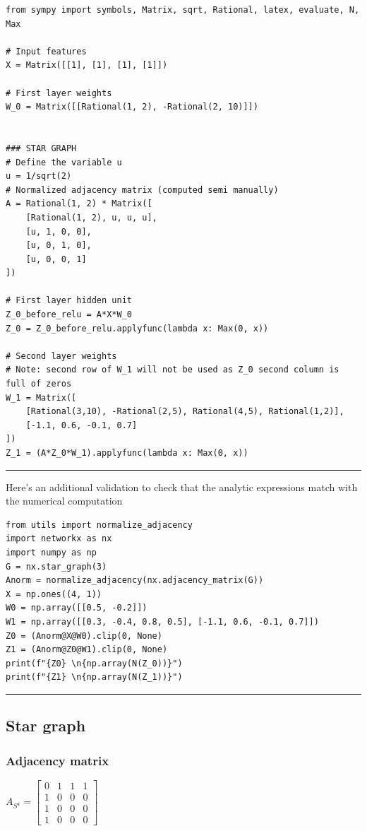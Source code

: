 \documentclass[a4paper]{article}
\begin{document}
\begin{verbatim}
from sympy import symbols, Matrix, sqrt, Rational, latex, evaluate, N, Max

# Input features
X = Matrix([[1], [1], [1], [1]])

# First layer weights
W_0 = Matrix([[Rational(1, 2), -Rational(2, 10)]])


### STAR GRAPH
# Define the variable u
u = 1/sqrt(2)
# Normalized adjacency matrix (computed semi manually)
A = Rational(1, 2) * Matrix([
    [Rational(1, 2), u, u, u],
    [u, 1, 0, 0],
    [u, 0, 1, 0],
    [u, 0, 0, 1]
])

# First layer hidden unit
Z_0_before_relu = A*X*W_0
Z_0 = Z_0_before_relu.applyfunc(lambda x: Max(0, x))

# Second layer weights 
# Note: second row of W_1 will not be used as Z_0 second column is full of zeros
W_1 = Matrix([
    [Rational(3,10), -Rational(2,5), Rational(4,5), Rational(1,2)],
    [-1.1, 0.6, -0.1, 0.7]
])
Z_1 = (A*Z_0*W_1).applyfunc(lambda x: Max(0, x))
\end{verbatim}


\hrule
Here's an additional validation to check that the analytic expressions match with the numerical computation
\begin{verbatim}
from utils import normalize_adjacency
import networkx as nx
import numpy as np
G = nx.star_graph(3)
Anorm = normalize_adjacency(nx.adjacency_matrix(G))
X = np.ones((4, 1))
W0 = np.array([[0.5, -0.2]])
W1 = np.array([[0.3, -0.4, 0.8, 0.5], [-1.1, 0.6, -0.1, 0.7]])
Z0 = (Anorm@X@W0).clip(0, None)
Z1 = (Anorm@Z0@W1).clip(0, None)
print(f"{Z0} \n{np.array(N(Z_0))}")
print(f"{Z1} \n{np.array(N(Z_1))}")
\end{verbatim}
\hrule

\break
\subsection*{Star graph}

\subsubsection*{Adjacency matrix}
$ A_{S^4} = \begin{bmatrix}
    0  &  1  &  1  &  1 \\
    1  &  0  &  0  &  0 \\
    1  &  0  &  0  &  0 \\
    1  &  0  &  0  &  0 
\end{bmatrix}
$
\end{document}
